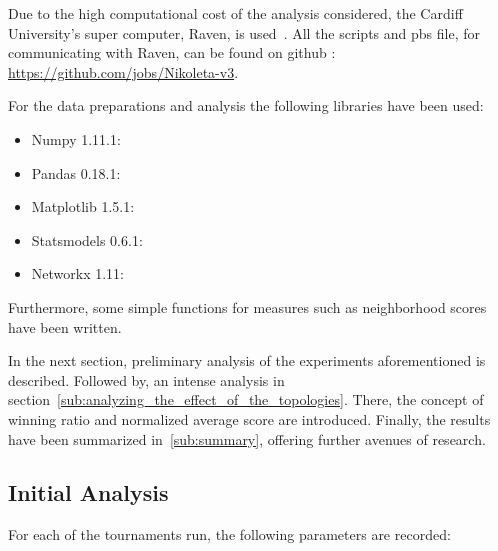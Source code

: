 Due to the high computational cost of the analysis considered, the Cardiff
University's super computer, Raven, is used~\cite{raven}. All the scripts and pbs file, for
communicating with Raven, can be found on github :
\url{https://github.com/jobs/Nikoleta-v3}.

For the data preparations and analysis the following libraries have been used:
\begin{multicols}{2}
	\begin{itemize}
		\item Numpy 1.11.1:
		\item Pandas 0.18.1:
		\item Matplotlib 1.5.1:
		\item Statsmodels 0.6.1:
		\item Networkx 1.11:
	\end{itemize}
\end{multicols}

Furthermore, some simple functions for measures such as neighborhood scores
have been written.



In the next section, preliminary analysis of the experiments aforementioned
is described. Followed by, an intense analysis in section~\ref{sub:analyzing_the_effect_of_the_topologies}.
There, the concept of winning ratio and normalized average score are introduced.
Finally, the results have been summarized in~\ref{sub:summary}, offering further
avenues of research.


\subsection{Initial Analysis}
\label{sub:initial_analysis}
For each of the tournaments run, the following parameters are recorded:

